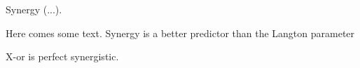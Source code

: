\documentclass[../main.tex]{subfiles}
\begin{document}
Synergy (...).



\cite{langton1990computation}
Here comes some text.
Synergy is a better predictor than the Langton parameter \cite{9999QuaxChli}

X-or is perfect synergistic.
\end{document}

